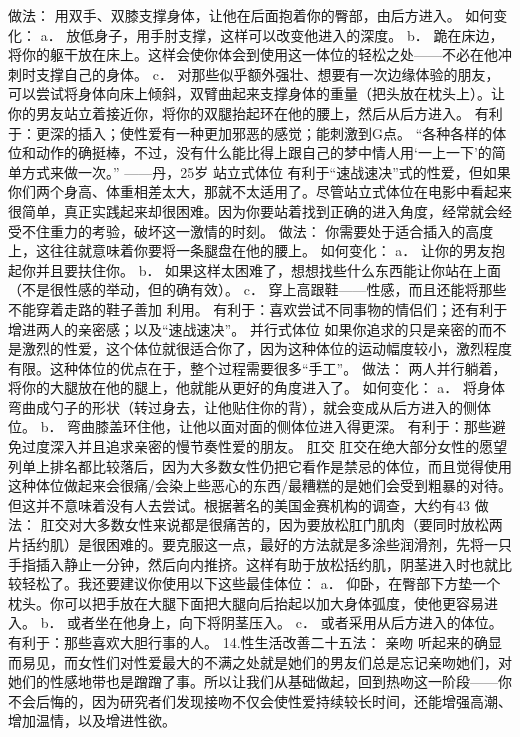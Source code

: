 \documentclass[12pt,UTF8]{ctexbook}
\begin{document}
做法：
用双手、双膝支撑身体，让他在后面抱着你的臀部，由后方进入。
如何变化：
a． 放低身子，用手肘支撑，这样可以改变他进入的深度。
b． 跪在床边，将你的躯干放在床上。这样会使你体会到使用这一体位的轻松之处——不必在他冲刺时支撑自己的身体。
c． 对那些似乎额外强壮、想要有一次边缘体验的朋友，可以尝试将身体向床上倾斜，双臂曲起来支撑身体的重量（把头放在枕头上）。让你的男友站立着接近你，将你的双腿抬起环在他的腰上，然后从后方进入。
有利于：更深的插入；使性爱有一种更加邪恶的感觉；能刺激到G点。
“各种各样的体位和动作的确挺棒，不过，没有什么能比得上跟自己的梦中情人用‘一上一下’的简单方式来做一次。”
——丹，25岁
站立式体位
有利于“速战速决”式的性爱，但如果你们两个身高、体重相差太大，那就不太适用了。尽管站立式体位在电影中看起来很简单，真正实践起来却很困难。因为你要站着找到正确的进入角度，经常就会经受不住重力的考验，破坏这一激情的时刻。
做法：
你需要处于适合插入的高度上，这往往就意味着你要将一条腿盘在他的腰上。
如何变化：
a． 让你的男友抱起你并且要扶住你。
b． 如果这样太困难了，想想找些什么东西能让你站在上面（不是很性感的举动，但的确有效）。
c． 穿上高跟鞋——性感，而且还能将那些不能穿着走路的鞋子善加 利用。
有利于：喜欢尝试不同事物的情侣们；还有利于增进两人的亲密感；以及“速战速决”。
并行式体位
如果你追求的只是亲密的而不是激烈的性爱，这个体位就很适合你了，因为这种体位的运动幅度较小，激烈程度有限。这种体位的优点在于，整个过程需要很多“手工”。
做法：
两人并行躺着，将你的大腿放在他的腿上，他就能从更好的角度进入了。
如何变化：
a． 将身体弯曲成勺子的形状（转过身去，让他贴住你的背），就会变成从后方进入的侧体位。
b． 弯曲膝盖环住他，让他以面对面的侧体位进入得更深。
有利于：那些避免过度深入并且追求亲密的慢节奏性爱的朋友。
肛交
肛交在绝大部分女性的愿望列单上排名都比较落后，因为大多数女性仍把它看作是禁忌的体位，而且觉得使用这种体位做起来会很痛/会染上些恶心的东西/最糟糕的是她们会受到粗暴的对待。但这并不意味着没有人去尝试。根据著名的美国金赛机构的调查，大约有43%
做法：
肛交对大多数女性来说都是很痛苦的，因为要放松肛门肌肉（要同时放松两片括约肌）是很困难的。要克服这一点，最好的方法就是多涂些润滑剂，先将一只手指插入静止一分钟，然后向内推挤。这样有助于放松括约肌，阴茎进入时也就比较轻松了。我还要建议你使用以下这些最佳体位：
a． 仰卧，在臀部下方垫一个枕头。你可以把手放在大腿下面把大腿向后抬起以加大身体弧度，使他更容易进入。
b． 或者坐在他身上，向下将阴茎压入。
c． 或者采用从后方进入的体位。
有利于：那些喜欢大胆行事的人。
14.性生活改善二十五法：
亲吻
听起来的确显而易见，而女性们对性爱最大的不满之处就是她们的男友们总是忘记亲吻她们，对她们的性感地带也是蹭蹭了事。所以让我们从基础做起，回到热吻这一阶段——你不会后悔的，因为研究者们发现接吻不仅会使性爱持续较长时间，还能增强高潮、增加温情，以及增进性欲。
\end{document}
